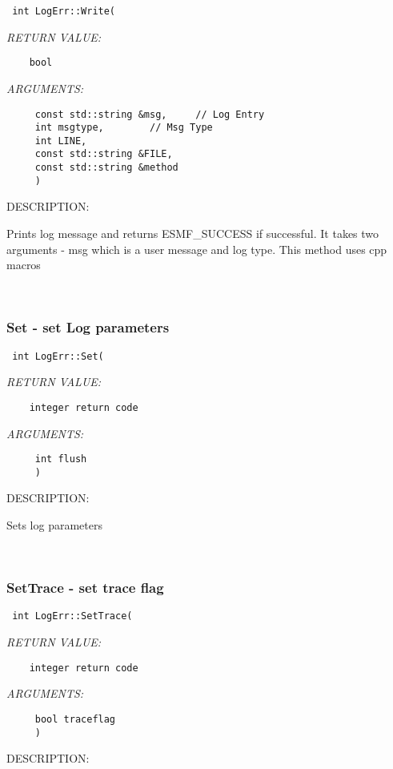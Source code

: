 {  
\begin{verbatim} 
 int LogErr::Write(
 \end{verbatim}{\em RETURN VALUE:}
\begin{verbatim}    bool\end{verbatim}{\em ARGUMENTS:}
\begin{verbatim}     const std::string &msg,     // Log Entry
     int msgtype,        // Msg Type
     int LINE,
     const std::string &FILE,
     const std::string &method
     )\end{verbatim}
{\sf DESCRIPTION:\\ }


   Prints log message and returns ESMF_SUCCESS if successful.  It takes two
   arguments -
   msg which is a user message and log type.  This method uses cpp macros 
 
\mbox{}\hrulefill\ 
 
\subsubsection [Set] {Set - set Log parameters}


  
\begin{verbatim} 
 int LogErr::Set(
 \end{verbatim}{\em RETURN VALUE:}
\begin{verbatim}    integer return code\end{verbatim}{\em ARGUMENTS:}
\begin{verbatim}     int flush
     )\end{verbatim}
{\sf DESCRIPTION:\\ }


   Sets log parameters 
 
\mbox{}\hrulefill\ 
 
\subsubsection [SetTrace] {SetTrace - set trace flag}


  
\begin{verbatim} 
 int LogErr::SetTrace(
 \end{verbatim}{\em RETURN VALUE:}
\begin{verbatim}    integer return code\end{verbatim}{\em ARGUMENTS:}
\begin{verbatim}     bool traceflag
     )\end{verbatim}
{\sf DESCRIPTION:\\ }


}
